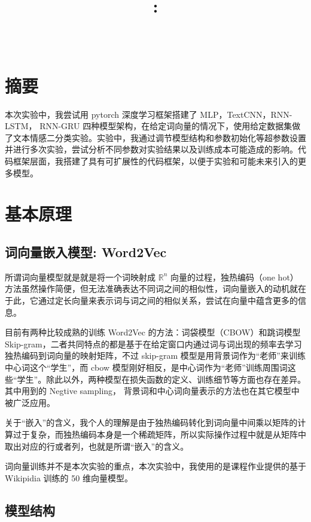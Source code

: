 \documentclass{article}
\title{\textmd{\bf \Class: \Title}}
\author{\textbf{\StudentName}\ \ \StudentClass\ \ \StudentNumber}
\begin{document}
\begin{spacing}{1.1}
\maketitle \thispagestyle{empty}
\section{摘要}
\hspace{1.4em} 本次实验中，我尝试用 pytorch 深度学习框架搭建了 MLP，TextCNN，RNN-LSTM， RNN-GRU 四种模型架构，在给定词向量的情况下，使用给定数据集做了文本情感二分类实验。实验中，我通过调节模型结构和参数初始化等超参数设置并进行多次实验，尝试分析不同参数对实验结果以及训练成本可能造成的影响。代码框架层面，我搭建了具有可扩展性的代码框架，以便于实验和可能未来引入的更多模型。

\section{基本原理}
	\subsection{词向量嵌入模型: Word2Vec}
	\hspace{1.4em} 
	所谓词向量模型就是就是将一个词映射成 $\mathbb{R}^n$ 向量的过程，独热编码（one hot）方法虽然操作简便，但无法准确表达不同词之间的相似性，词向量嵌入的动机就在于此，它通过定长向量来表示词与词之间的相似关系，尝试在向量中蕴含更多的信息。
	
	目前有两种比较成熟的训练 Word2Vec 的方法：词袋模型（CBOW）和跳词模型 Skip-gram，二者共同特点的都是基于在给定窗口内通过词与词出现的频率去学习独热编码到词向量的映射矩阵，不过 skip-gram 模型是用背景词作为“老师”来训练中心词这个“学生”，而 cbow 模型刚好相反，是中心词作为“老师”训练周围词这些“学生”。除此以外，两种模型在损失函数的定义、训练细节等方面也存在差异。其中用到的 Negtive sampling， 背景词和中心词向量表示的方法也在其它模型中被广泛应用。
	 
	关于“嵌入”的含义，我个人的理解是由于独热编码转化到词向量中间乘以矩阵的计算过于复杂，而独热编码本身是一个稀疏矩阵，所以实际操作过程中就是从矩阵中取出对应的行或者列，也就是所谓“嵌入”的含义。
	
	词向量训练并不是本次实验的重点，本次实验中，我使用的是课程作业提供的基于 Wikipidia 训练的 50 维向量模型。
	
	\subsection{模型结构}

\end{spacing}
\end{document}
